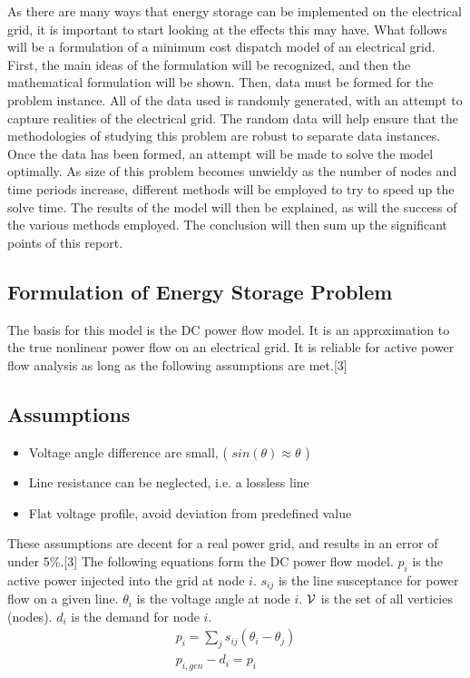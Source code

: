As there are many ways that energy storage can be implemented on the electrical grid, it is
important to start looking at the effects this may have. What follows will be a formulation of a
minimum cost dispatch model of an electrical grid. First, the main ideas of the formulation will be
recognized, and then the mathematical formulation will be shown. Then, data must be formed for the
problem instance. All of the data used is randomly generated, with an attempt to capture realities of
the electrical grid. The random data will help ensure that the methodologies of studying this problem
are robust to separate data instances. Once the data has been formed, an attempt will be made to solve
the model optimally. As size of this problem becomes unwieldy as the number of nodes and time
periods increase, different methods will be employed to try to speed up the solve time. The results of
the model will then be explained, as will the success of the various methods employed. The conclusion
will then sum up the significant points of this report.

\subsection{Formulation of Energy Storage Problem}
The basis for this model is the DC power flow model. It is an approximation to the true nonlinear
power flow on an electrical grid. It is reliable for active power flow analysis as long as the
following assumptions are met.[3]
\subsection{Assumptions}
\begin{itemize}
\item Voltage angle difference are small, ( $sin( \theta ) \approx \theta $ )
\item Line resistance can be neglected, i.e. a lossless line
\item Flat voltage profile, avoid deviation from predefined value
\end{itemize}
These assumptions are decent for a real power grid, and results in an error of under 5\%.[3] The
following equations form the DC power flow model. $p_i$ is the active power injected into the grid at
node $i$.  $s_{ij}$ is the line susceptance for power flow on a given line. $\theta_i$ is the voltage angle at node $i$. $\mathcal{V}$ is
the set of all verticies (nodes).  $d_i$ is the demand for node $i$. 
\begin{align*}
	p_i = \sum_j s_{ij} ( \theta_i - \theta_j ) \\
	p_{i,gen} - d_i  = p_i
\end{align*}


